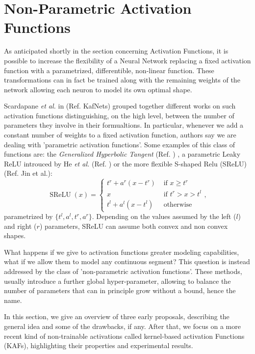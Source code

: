 \documentclass[LaM,binding=0.6cm]{./packages/sapthesis/sapthesis}
\begin{document}
    \chapter{Non-Parametric Activation Functions}

    As anticipated shortly in the section concerning Activation Functions, it is possible to increase the flexibility of a Neural Network replacing a fixed activation function with a parametrized, differentible, non-linear function.
    These transformations can in fact be trained along with the remaining weights of the network allowing each neuron to model its own optimal shape.

    Scardapane \textit{et al.} in (Ref. KafNets) grouped together different works on such activation functions distinguishing, on the high level, between the number of parameters they involve in their formualtions.
    In particular, whenever we add a constant number of weights to a fixed activation function, authors say we are dealing with 'parametric activation functions'. Some examples of this class of functions are: the \textit{Generalized Hyperbolic Tangent} (Ref. )
    , a parametric Leaky ReLU introuced by He \textit{et al.} (Ref. ) or the more flexible S-shaped Relu (SReLU) (Ref.  Jin et al.):
    \begin{equation}
        \label{srelu}
        \operatorname{SReLU}(x)=\left\{\begin{array}{ll}
            t^{r}+a^{r}\left(x-t^{r}\right) & \text { if } x \geq t^{r} \\
            x & \text { if } t^{r}>x>t^{l} \\
            t^{l}+a^{l}\left(x-t^{l}\right) & \text { otherwise }
            \end{array}\right.
            ,
    \end{equation}
    parametrized by $\{t^l,a^l,t^r,a^r\}$. Depending on the values assumed by the left ($l$) and right ($r$) parameters, SReLU can assume both convex and non convex shapes.

    What happens if we give to activation functions greater modeling capabilities, what if we allow them to model any continuous segment? This question is instead addressed by the class of 'non-parametric activation functions'. These methods,
    usually introduce a further global hyper-parameter, allowing to balance the number of parameters that can in principle grow without a bound, hence the name.

    In this section, we give an overview of three early proposals, describing the general idea and some of the drawbacks, if any. After that, we focus on a more recent kind of non-trainable activations called kernel-based activation Functions
    (KAFs), highlighting their properties and experimental results.
\end{document}
